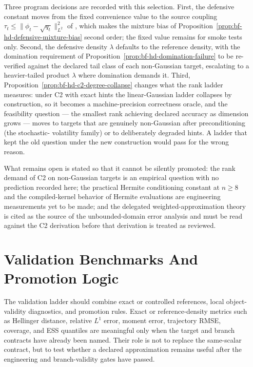 Three program decisions are recorded with this selection.  First, the
defensive constant moves from the fixed convenience value to the source
coupling \(\tau_t\le\lVert\phi_t-\sqrt{q_t}\rVert_{L^2}^2\) of
\citet[Proposition~11]{zhao2024ttsequential}, which makes the mixture
bias of Proposition~\ref{prop:bf-hd-defensive-mixture-bias} second order;
the fixed value remains for smoke tests only.  Second, the defensive
density \(\lambda\) defaults to the reference density, with the
domination requirement of
Proposition~\ref{prop:bf-hd-domination-failure} to be re-verified
against the declared tail class of each non-Gaussian target, escalating
to a heavier-tailed product \(\lambda\) where domination demands it.
Third, Proposition~\ref{prop:bf-hd-c2-degree-collapse} changes what the
rank ladder measures: under C2 with exact hints the linear-Gaussian
ladder collapses by construction, so it becomes a machine-precision
correctness oracle, and the feasibility question --- the smallest rank
achieving declared accuracy as dimension grows --- moves to targets that
are genuinely non-Gaussian after preconditioning (the stochastic-%
volatility family) or to deliberately degraded hints.  A ladder that
kept the old question under the new construction would pass for the
wrong reason.

What remains open is stated so that it cannot be silently promoted:
the rank demand of C2 on non-Gaussian targets is an empirical question
with no prediction recorded here; the practical Hermite conditioning
constant at \(n\ge8\) and the compiled-kernel behavior of Hermite
evaluations are engineering measurements yet to be made; and the
delegated weighted-approximation theory
\citep{cui2022deep,cui2023selfreinforced} is cited as the source of the
unbounded-domain error analysis and must be read against the C2
derivation before that derivation is treated as reviewed.

\section{Validation Benchmarks And Promotion Logic}
\label{sec:bf-hd-validation-benchmarks}


The validation ladder should combine exact or controlled references, local
object-validity diagnostics, and promotion rules.  Exact or reference-density
metrics such as Hellinger distance, relative \(L^1\) error, moment error,
trajectory RMSE, coverage, and ESS quantiles are meaningful only when the target
and branch contracts have already been named.  Their role is not to replace the
same-scalar contract, but to test whether a declared approximation remains
useful after the engineering and branch-validity gates have passed.


